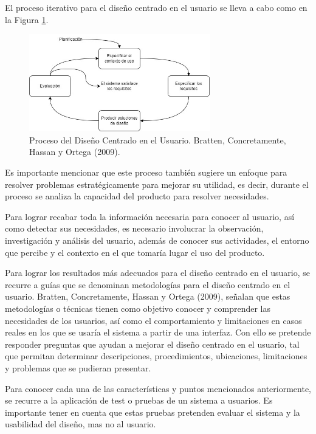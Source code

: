 El proceso iterativo para el diseño centrado en el usuario se lleva a cabo como en la Figura \ref{fig:33}.

\begin{figure}[H]
  \centering
  \includegraphics[width=0.70\textwidth]{Cap3/Figuras/DCU.jpg}
  \caption{Proceso del Diseño Centrado en el Usuario. Bratten, Concretamente, Hassan y Ortega (2009).}
  \label{fig:33}
\end{figure}

Es importante mencionar que este proceso también sugiere un enfoque para resolver problemas estratégicamente para mejorar su utilidad, es decir, durante el proceso se analiza la capacidad del producto para resolver necesidades.

Para lograr recabar toda la información necesaria para conocer al usuario, así como detectar sus necesidades, es necesario involucrar la observación, investigación y análisis del usuario, además de conocer sus actividades, el entorno que percibe y el contexto en el que tomaría lugar el uso del producto.

Para lograr los resultados más adecuados para el diseño centrado en el usuario, se recurre a guías que se denominan metodologías para el diseño centrado en el usuario. Bratten, Concretamente, Hassan y Ortega (2009), señalan que estas metodologías o técnicas tienen como objetivo conocer y comprender las necesidades de los usuarios, así como el comportamiento y limitaciones en casos reales en los que se usaría el sistema a partir de una interfaz. Con ello se pretende responder preguntas que ayudan a mejorar el diseño centrado en el usuario, tal que permitan determinar descripciones, procedimientos, ubicaciones, limitaciones y problemas que se pudieran presentar.

Para conocer cada una de las características y puntos mencionados anteriormente, se recurre a la aplicación de test o pruebas de un sistema a usuarios. Es importante tener en cuenta que estas pruebas pretenden evaluar el sistema y la usabilidad del diseño, mas no al usuario.

